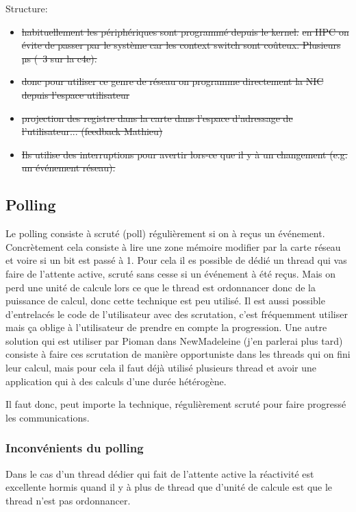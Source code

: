 Structure:
\begin{itemize}
  \item \st{habituellement les périphériques sont programmé depuis le kernel.}
  \st{en HPC on évite de passer par le système car les context switch sont coûteux.
  Plusieurs µs (~3 sur la c4e).}
  \item \st{donc pour utiliser ce genre de réseau on programme directement la NIC depuis l'espace utilisateur}
  \item \st{projection des registre dans la carte dans l'espace d'adressage de l'utilisateur... (feedback Mathieu)}
  \item \st{Ils utilise des interruptions pour avertir lors-ce que il y à un changement (e.g. un événement réseau).}
\end{itemize}

\subsection{Polling}

Le polling consiste à scruté (poll) régulièrement si on à reçus un événement.
Concrètement cela consiste à lire une zone mémoire modifier par la carte réseau et voire si un bit est passé à 1.
Pour cela il es possible de dédié un thread qui vas faire de l'attente active, scruté sans cesse si un événement à été reçus.
Mais on perd une unité de calcule lors ce que le thread est ordonnancer donc de la puissance de calcul, donc cette technique est peu utilisé. %
Il est aussi possible d'entrelacés le code de l'utilisateur avec des scrutation, c'est fréquemment utiliser mais ça oblige à l'utilisateur de prendre en compte la progression.
Une autre solution qui est utiliser par Pioman dans NewMadeleine (j'en parlerai plus tard) consiste à faire ces scrutation de manière opportuniste dans les threads qui on fini leur calcul, mais pour cela il faut déjà utilisé plusieurs thread et avoir une application qui à des calculs d'une durée hétérogène.

Il faut donc, peut importe la technique, régulièrement scruté pour faire progressé les communications.

\subsubsection{Inconvénients du polling}


Dans le cas d'un thread dédier qui fait de l'attente active la réactivité est excellente hormis quand il y à plus de thread que d'unité de calcule est que le thread n'est pas ordonnancer.


